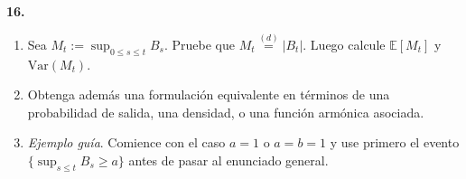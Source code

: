 \documentclass[11pt, letterpaper]{article}
\begin{document}
\newpage

\begin{ejercicio}
    \textbf{16.} 
    \begin{enumerate}
        \item Sea $M_t := \sup_{0 \le s \le t} B_s$. Pruebe que $M_t \stackrel{(d)}{=} |B_t|$. Luego calcule $\mathbb{E}[M_t]$ y $\text{Var}(M_t)$.
        \item Obtenga además una formulación equivalente en términos de una probabilidad de salida, una densidad, o una función armónica asociada.
        \item \textit{Ejemplo guía}. Comience con el caso $a = 1$ o $a = b = 1$ y use primero el evento $\{\sup_{s \le t} B_s \ge a\}$ antes de pasar al enunciado general.
    \end{enumerate}
\end{ejercicio}

\vspace{5mm}
\end{document}
